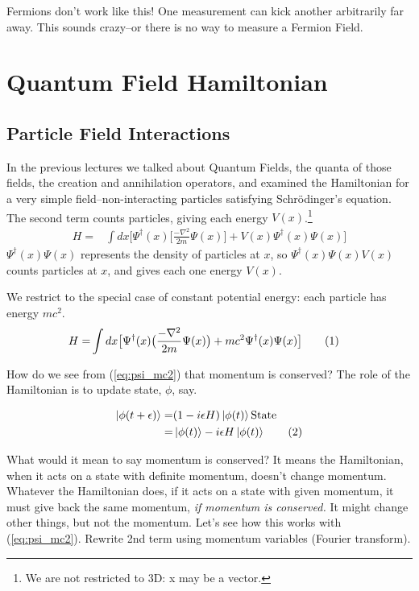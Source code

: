 \documentclass[]{article}
\newcommand\numberthis{\addtocounter{equation}{1}\tag{\theequation}}
\begin{document}
Fermions don't work like this! One measurement can kick another arbitrarily far away. This sounds crazy--or there is no way to measure a Fermion Field.

\section{Quantum Field Hamiltonian}

\subsection{Particle Field Interactions}

In the previous lectures we talked about Quantum Fields, the quanta of those fields, the creation and annihilation operators, and examined the Hamiltonian for a very simple field--non-interacting particles satisfying Schr\"odinger's equation. The second term counts particles, giving each energy $V(x)$.\footnote{We are not restricted to 3D: x may be a vector.}
\begin{align*}
	H =& \int dx \big[ \Psi^\dagger(x) \big[\frac{- \nabla^2}{2m} \Psi(x) \big]+ V(x) \Psi^\dagger(x) \Psi(x) \big] 
\end{align*}
$\Psi^\dagger(x) \Psi(x)$ represents the density of particles at $x$, so $\Psi^\dagger(x) \Psi(x) V(x)$ counts particles at $x$, and gives each one energy $V(x)$.

We restrict to the special case of constant potential energy: each particle has energy $mc^2$.
\begin{align*}
	H=&\int dx \big[\Psi^\dagger(x) \big(\frac{- \nabla^2}{2m} \Psi(x)\big) + mc^2 \Psi^\dagger(x) \Psi(x)\big]  \numberthis\label{eq:psi_mc2}
\end{align*}

How do we see from (\ref{eq:psi_mc2}) that momentum is conserved? The role of the Hamiltonian is to update state, $\phi$, say.

\begin{align*}
	\ket{\phi(t+\epsilon)} =& (1-i \epsilon H) \ket{\phi(t)} \text{State}\\
	=& \ket{\phi(t)} -i \epsilon H \ket{\phi(t)} \numberthis \label{eq:update:state}
\end{align*}

What would it mean to say momentum is conserved? It means the Hamiltonian, when it acts on a state with definite momentum, doesn't change momentum. Whatever the Hamiltonian does, if it acts on a state with given momentum, it must give back the same momentum, \emph{if momentum is conserved.} It might change other things, but not the momentum. Let's see how this works with (\ref{eq:psi_mc2}). Rewrite 2nd term  using momentum variables (Fourier transform).
\end{document}
